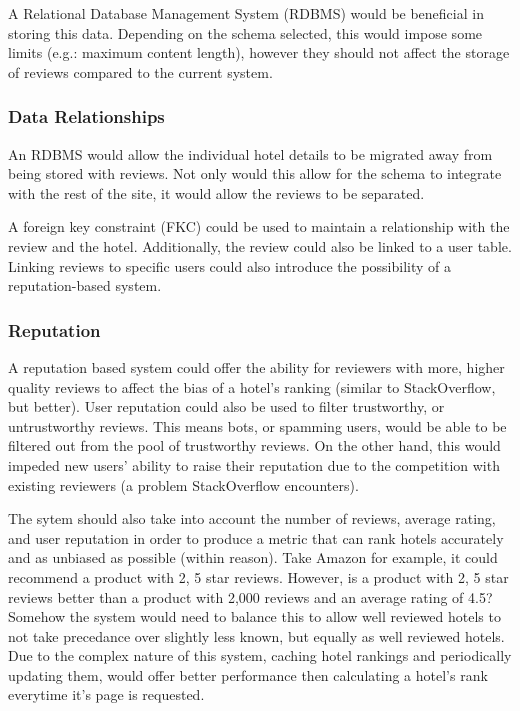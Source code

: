 \documentclass[a4paper]{article}
\begin{document}
A Relational Database Management System (RDBMS) would be beneficial in storing this data.
Depending on the schema selected, this would impose some limits (e.g.: maximum content length), however they should not affect the storage of reviews compared to the current system.

\subsubsection{Data Relationships}
An RDBMS would allow the individual hotel details to be migrated away from being stored with reviews.
Not only would this allow for the schema to integrate with the rest of the site, it would allow the reviews to be separated.

A foreign key constraint (FKC) could be used to maintain a relationship with the review and the hotel.
Additionally, the review could also be linked to a user table.
Linking reviews to specific users could also introduce the possibility of a reputation-based system.

\subsubsection{Reputation}
A reputation based system could offer the ability for reviewers with more, higher quality reviews to affect the bias of a hotel's ranking (similar to StackOverflow, but better).
User reputation could also be used to filter trustworthy, or untrustworthy reviews.
This means bots, or spamming users, would be able to be filtered out from the pool of trustworthy reviews.
On the other hand, this would impeded new users' ability to raise their reputation due to the competition with existing reviewers (a problem StackOverflow encounters).

The sytem should also take into account the number of reviews, average rating, and user reputation in order to produce a metric that can rank hotels accurately and as unbiased as possible (within reason).
Take Amazon for example, it could recommend a product with 2, 5 star reviews.
However, is a product with 2, 5 star reviews better than a product with 2,000 reviews and an average rating of 4.5?
Somehow the system would need to balance this to allow well reviewed hotels to not take precedance over slightly less known, but equally as well reviewed hotels.
Due to the complex nature of this system, caching hotel rankings and periodically updating them, would offer better performance then calculating a hotel's rank everytime it's page is requested.
\end{document}
